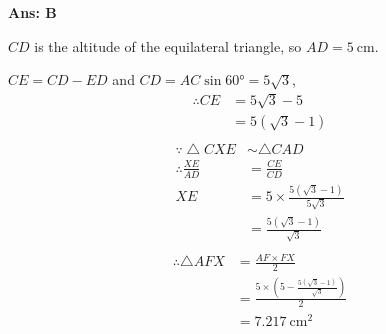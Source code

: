 \documentclass[border=3pt,varwidth=70mm]{standalone}
\begin{document}
\begin{answer}
\hrulefill\par
\textbf{Ans: B}

$CD$ is the altitude of the equilateral triangle, so $AD = \SI{5}{\centi\meter}$.

$CE=CD-ED$ and $CD=AC\sin\ang{60}=5\sqrt{3}$,
\begin{equation*}
\begin{aligned}
\therefore CE &= 5\sqrt{3} - 5 \\
			  &= 5(\sqrt{3}-1) \\
\end{aligned}
\end{equation*}
\begin{equation*}
\begin{aligned}
\because \bigtriangleup CXE &\sim \bigtriangleup CAD \\
\therefore \frac{XE}{AD} &= \frac{CE}{CD} \\
XE &= 5\times\frac{5(\sqrt{3}-1)}{5\sqrt{3}} \\
	&= \frac{5(\sqrt{3}-1)}{\sqrt{3}} \\
\end{aligned}
\end{equation*}
\begin{equation*}
\begin{aligned}
\therefore \bigtriangleup AFX &= \frac{AF\times FX}{2} \\
							  &= \frac{5\times(5-\frac{5(\sqrt{3}-1)}{\sqrt{3}})}{2} \\
							  &= \SI{7.217}{\centi\meter\squared}
\end{aligned}
\end{equation*}

\end{answer}
\end{document}
